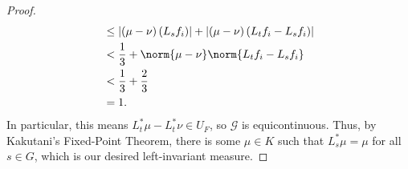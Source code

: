 \documentclass[10pt]{mypackage}
\begin{document}
\begin{proof}
\begin{align*}
                                                                            &\leq \left\vert \left( \mu-\nu \right)\left( L_sf_i \right) \right\vert + \left\vert \left( \mu-\nu \right)\left( L_tf_i - L_sf_i \right) \right\vert\\
                                                                            &< \frac{1}{3} + \norm{\mu-\nu}\norm{L_tf_i - L_sf_i}\\
                                                                            &< \frac{1}{3} + \frac{2}{3}\\
                                                                            &= 1.
  \end{align*}
  In particular, this means $L_t^{\ast}\mu - L_t^{\ast}\nu \in U_F$, so $\mathcal{G}$ is equicontinuous. Thus, by Kakutani's Fixed-Point Theorem, there is some $\mu\in K$ such that $L_s^{\ast}\mu = \mu$ for all $s\in G$, which is our desired left-invariant measure.
\end{proof}
\nocite{davidson_functional_analysis,conway_functional_analysis}
\printbibliography
\end{document}
